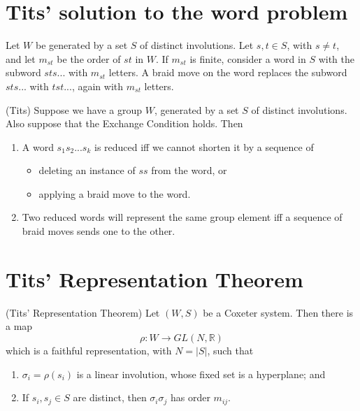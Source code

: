 \documentclass[11pt]{article}
\begin{document}
\section{Tits' solution to the word problem}

\begin{definition}
    Let $W$ be generated by a set $S$ of distinct involutions. Let $s,t\in S$, with $s\neq t$, and let $m_{st}$ be the order of $st$ in $W$. If $m_{st}$ is finite, consider a word in $S$ with the subword $sts...$ with $m_{st}$ letters. A braid move on the word replaces the subword $sts...$ with $tst...$, again with $m_{st}$ letters. 
\end{definition}

\begin{theorem}
    (Tits) Suppose we have a group $W$, generated by a set $S$ of distinct involutions. Also suppose that the Exchange Condition holds. Then
    \begin{enumerate}
        \item A word $s_1s_2...s_k$ is reduced iff we cannot shorten it by a sequence of 
        \begin{itemize}
            \item deleting an instance of $ss$ from the word, or
            \item applying a braid move to the word.
        \end{itemize}
        \item Two reduced words will represent the same group element iff a sequence of braid moves sends one to the other.
    \end{enumerate}
\end{theorem}


\section{Tits' Representation Theorem}
\begin{theorem}
    (Tits' Representation Theorem) Let $(W,S)$ be a Coxeter system. Then there is a map
    \[\rho : W \longrightarrow GL(N,\mathbb{R})\]
    which is a faithful representation, with $N=|S|$, such that
    \begin{enumerate}
        \item $\sigma_i = \rho (s_i)$ is a linear involution, whose fixed set is a hyperplane; and 
        \item If $s_i,s_j\in S$ are distinct, then $\sigma_i\sigma_j$ has order $m_{ij}$.  
    \end{enumerate}
\end{theorem}
\end{document}
